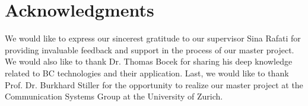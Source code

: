 \chapter*{Acknowledgments}

We would like to express our sincerest gratitude to our supervisor Sina Rafati for providing invaluable feedback and support in the process of our master project. We would also like to thank Dr. Thomas Bocek for sharing his deep knowledge related to BC technologies and their application. Last, we would like to thank Prof. Dr. Burkhard Stiller for the opportunity to realize our master project at the Communication Systems Group at the University of Zurich.
